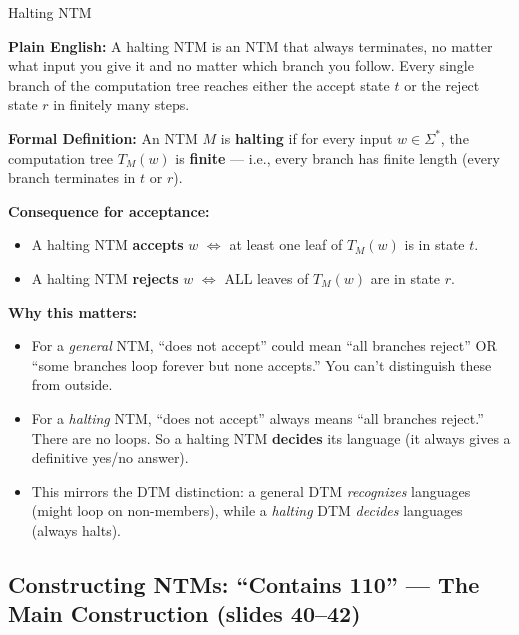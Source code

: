 \begin{definitionbox}{Halting NTM}

\textbf{Plain English:}
A halting NTM is an NTM that always terminates, no matter what input you give
it and no matter which branch you follow. Every single branch of the computation
tree reaches either the accept state $t$ or the reject state $r$ in finitely
many steps.

\textbf{Formal Definition:}
An NTM $M$ is \textbf{halting} if for every input $w \in \Sigma^*$, the
computation tree $T_M(w)$ is \textbf{finite} --- i.e., every branch has finite
length (every branch terminates in $t$ or $r$).

\textbf{Consequence for acceptance:}
\begin{itemize}[nosep]
\item A halting NTM \textbf{accepts} $w$ $\iff$ at least one leaf of $T_M(w)$
  is in state $t$.
\item A halting NTM \textbf{rejects} $w$ $\iff$ ALL leaves of $T_M(w)$ are in
  state $r$.
\end{itemize}

\textbf{Why this matters:}
\begin{itemize}[nosep]
\item For a \emph{general} NTM, ``does not accept'' could mean ``all branches
  reject'' OR ``some branches loop forever but none accepts.'' You can't
  distinguish these from outside.
\item For a \emph{halting} NTM, ``does not accept'' always means ``all branches
  reject.'' There are no loops. So a halting NTM \textbf{decides} its language
  (it always gives a definitive yes/no answer).
\item This mirrors the DTM distinction: a general DTM \emph{recognizes}
  languages (might loop on non-members), while a \emph{halting} DTM
  \emph{decides} languages (always halts).
\end{itemize}

\end{definitionbox}

\subsection{Constructing NTMs: ``Contains 110'' --- The Main Construction (slides 40--42)}
\label{subsec:construct-110}

